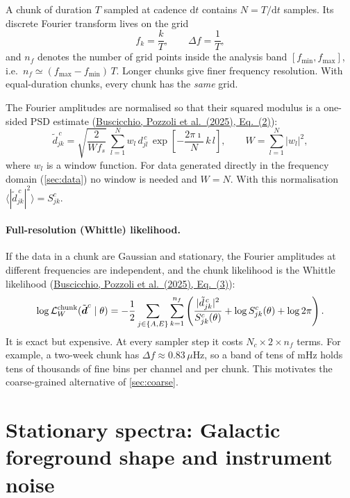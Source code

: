 \documentclass[11pt,a4paper]{article}
\newcommand{\urlPone}{https://arxiv.org/pdf/2511.03604}
\newcommand{\PoneEq}[1]{\href{\urlPone}{Buscicchio, Pozzoli et al.~(2025), Eq.~(#1)}}
\newcommand{\dd}{\mathrm{d}}
\begin{document}
A chunk of duration $T$ sampled at cadence $\dd t$ contains $N = T/\dd t$ samples.
Its discrete Fourier transform lives on the grid
\begin{equation}
  f_k = \frac{k}{T}, \qquad \Delta f = \frac{1}{T},
\end{equation}
and $n_f$ denotes the number of grid points inside the analysis band
$[f_{\min},f_{\max}]$, i.e.\ $n_f \simeq (f_{\max}-f_{\min})\,T$. Longer chunks give
finer frequency resolution. With equal-duration chunks, every chunk has the
\emph{same} grid.

The Fourier amplitudes are normalised so that their squared modulus is a one-sided
PSD estimate (\PoneEq{2}):
\begin{equation}
  \tilde d^{\,c}_{jk} = \sqrt{\frac{2}{W f_s}}\ \sum_{l=1}^{N} w_l\, d^{\,c}_{jl}\,
  \exp\!\left[-\frac{2\pi\imath}{N}\,k\,l\right],
  \qquad W=\sum_{l=1}^N |w_l|^2,
  \label{eq:dft}
\end{equation}
where $w_l$ is a window function. For data generated directly in the frequency
domain (\cref{sec:data}) no window is needed and $W=N$. With this normalisation
$\langle|\tilde d^{\,c}_{jk}|^2\rangle = S^c_{jk}$.

\paragraph{Full-resolution (Whittle) likelihood.}
If the data in a chunk are Gaussian and stationary, the Fourier amplitudes at
different frequencies are independent, and the chunk likelihood is the Whittle
likelihood (\PoneEq{3}):
\begin{equation}
  \log\mathcal{L}^{\rm chunk}_W(\tilde{\boldsymbol d}^c\mid\theta) =
  -\frac12 \sum_{j\in\{A,E\}} \sum_{k=1}^{n_f}
  \left( \frac{|\tilde d^{\,c}_{jk}|^2}{S^c_{jk}(\theta)} + \log S^c_{jk}(\theta) + \log 2\pi \right).
  \label{eq:whittle}
\end{equation}
It is exact but expensive. At every sampler step it costs
$N_c\times 2\times n_f$ terms. For example, a two-week chunk has
$\Delta f\approx 0.83\,\mu$Hz, so a band of tens of mHz holds tens of thousands of
fine bins per channel and per chunk. This motivates the coarse-grained alternative
of \cref{sec:coarse}.

\section{Stationary spectra: Galactic foreground shape and instrument noise}\label{sec:spectra}
\end{document}
